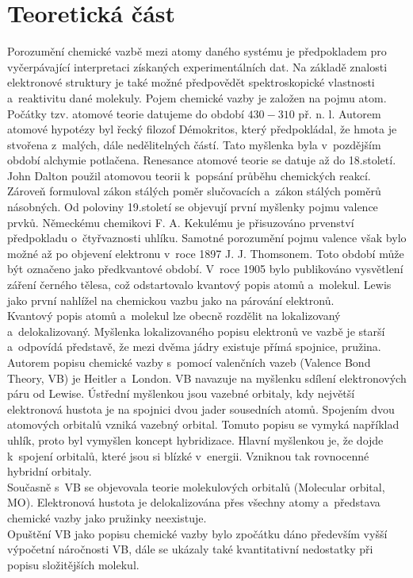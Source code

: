 \documentclass[
  printed, %
  table,   %
  lof,     %
  lot,     %
  oneside,
]{fithesis3}
\begin{document}
\chapter{Teoretická část}
Porozumění chemické vazbě mezi atomy daného systému je předpokladem pro vyčerpávající interpretaci získaných experimentálních dat. Na základě znalosti elektronové struktury je také možné předpovědět spektroskopické vlastnosti a~reaktivitu dané molekuly. Pojem chemické vazby je založen na pojmu atom. Počátky tzv. atomové teorie datujeme do období $430-310$ př. n. l. Autorem atomové hypotézy byl řecký filozof Démokritos, který předpokládal, že hmota je stvořena z~malých, dále nedělitelných částí. Tato myšlenka byla v~pozdějším období alchymie potlačena. Renesance atomové teorie se datuje až do 18.století. John Dalton použil atomovou teorii k~popsání průběhu chemických reakcí. Zároveň formuloval zákon stálých poměr slučovacích a~zákon stálých poměrů násobných. Od poloviny 19.století se objevují první myšlenky pojmu valence prvků. Německému chemikovi F. A. Kekulému je přisuzováno prvenství předpokladu o~čtyřvaznosti uhlíku. Samotné porozumění pojmu valence však bylo možné až po objevení elektronu v~roce 1897 J. J. Thomsonem. Toto období může být označeno jako předkvantové období. V~roce 1905 bylo publikováno vysvětlení záření černého tělesa, což odstartovalo kvantový popis atomů a~molekul. Lewis jako první nahlížel na chemickou vazbu jako na párování elektronů. \cite{Munzarova1996thesis} \\
Kvantový popis atomů a~molekul lze obecně rozdělit na lokalizovaný a~delokalizovaný. Myšlenka lokalizovaného popisu elektronů ve vazbě je starší a~odpovídá představě, že mezi dvěma jádry existuje přímá spojnice, pružina. Autorem popisu chemické vazby s~pomocí valenčních vazeb (Valence Bond Theory, VB) je Heitler a~London. VB navazuje na myšlenku sdílení elektronových páru od Lewise. Ústřední myšlenkou jsou vazebné orbitaly, kdy největší elektronová hustota je na spojnici dvou jader sousedních atomů. Spojením dvou atomových orbitalů vzniká vazebný orbital. Tomuto popisu se vymyká například uhlík, proto byl vymyšlen koncept hybridizace. Hlavní myšlenkou je, že dojde k~spojení orbitalů, které jsou si blízké v~energii. Vzniknou tak rovnocenné hybridní orbitaly. \cite{Munzarova1996thesis} \\
Současně s~VB se objevovala teorie molekulových orbitalů (Molecular orbital, MO). Elektronová hustota je delokalizována přes všechny atomy a~představa chemické vazby jako pružinky neexistuje.\cite{Munzarova1996thesis} \\
Opuštění VB jako popisu chemické vazby bylo zpočátku dáno především vyšší výpočetní náročnosti VB, dále se ukázaly také kvantitativní nedostatky při popisu složitějších molekul. \cite{lowe2011quantum} 
\end{document}
